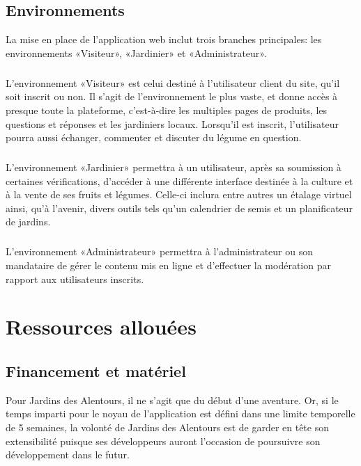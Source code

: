 \documentclass{scrreprt}
\def\projectname{Jardins des Alentours}
\begin{document}
\section{Environnements}
La mise en place de l'application web inclut trois branches
principales: les environnements «Visiteur», «Jardinier» et «Administrateur».

\paragraph{}
L'environnement «Visiteur» est celui destiné à l'utilisateur client du site, qu'il soit inscrit ou non.
Il s'agit de l'environnement le plus vaste, et donne accès à presque toute la plateforme, c'est-à-dire les multiples pages
de produits, les questions et réponses et les jardiniers locaux. Lorsqu'il est inscrit, l'utilisateur pourra
aussi échanger, commenter et discuter du légume en question.

\paragraph{}
L'environnement «Jardinier» permettra à un utilisateur, après sa soumission à certaines vérifications,
d'accéder à une différente interface destinée à la culture et à la vente de ses fruits et légumes. Celle-ci
inclura entre autres un étalage virtuel ainsi, qu'à l'avenir, divers outils tels qu'un calendrier de semis et un planificateur de jardins.

\paragraph{}
L'environnement «Administrateur» permettra à l'administrateur ou son mandataire
de gérer le contenu mis en ligne et d'effectuer la modération par rapport aux utilisateurs inscrits.


\chapter{Ressources allouées}
\section{Financement et matériel}

Pour \projectname{}, il ne s'agit que du début d'une aventure. Or, si le temps imparti
pour le noyau de l'application est défini dans une limite temporelle de 5 semaines, la volonté de
\projectname{} est de garder en tête son extensibilité puisque ses développeurs auront l'occasion de poursuivre
son développement dans le futur.
\end{document}
